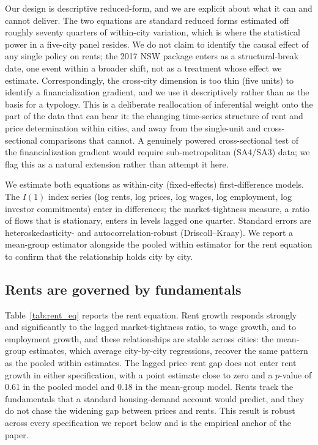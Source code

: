 \documentclass[preprint,11pt,authoryear]{elsarticle}
\begin{document}
Our design is descriptive reduced-form, and we are explicit about what
it can and cannot deliver. The two equations are standard reduced forms
estimated off roughly seventy quarters of within-city variation, which
is where the statistical power in a five-city panel resides. We do not
claim to identify the causal effect of any single policy on rents; the
2017 NSW package enters as a structural-break date, one event within a
broader shift, not as a treatment whose effect we estimate.
Correspondingly, the cross-city dimension is too thin (five units) to
identify a financialization gradient, and we use it descriptively rather
than as the basis for a typology. This is a deliberate reallocation of
inferential weight onto the part of the data that can bear it: the
changing time-series structure of rent and price determination within
cities, and away from the single-unit and cross-sectional comparisons
that cannot. A genuinely powered cross-sectional test of the
financialization gradient would require sub-metropolitan (SA4/SA3) data;
we flag this as a natural extension rather than attempt it here.

We estimate both equations as within-city (fixed-effects)
first-difference models. The $I(1)$ index series (log rents, log prices,
log wages, log employment, log investor commitments) enter in
differences; the market-tightness measure, a ratio of flows that is
stationary, enters in levels lagged one quarter. Standard errors are
heteroskedasticity- and autocorrelation-robust (Driscoll--Kraay). We report a
mean-group estimator alongside the pooled within estimator for the rent
equation to confirm that the relationship holds city by city.

\subsection{Rents are governed by fundamentals}
\label{sec:rent_eq}

Table~\ref{tab:rent_eq} reports the rent equation. Rent growth responds strongly
and significantly to the lagged market-tightness ratio, to wage growth, and to
employment growth, and these relationships are stable across cities: the mean-group
estimates, which average city-by-city regressions, recover the same pattern as the
pooled within estimates. The lagged price--rent gap does not enter rent growth in
either specification, with a point estimate close to zero and a $p$-value of 0.61
in the pooled model and 0.18 in the mean-group model. Rents track the fundamentals
that a standard housing-demand account would predict, and they do not chase the
widening gap between prices and rents. This result is robust across every
specification we report below and is the empirical anchor of the paper.
\end{document}
